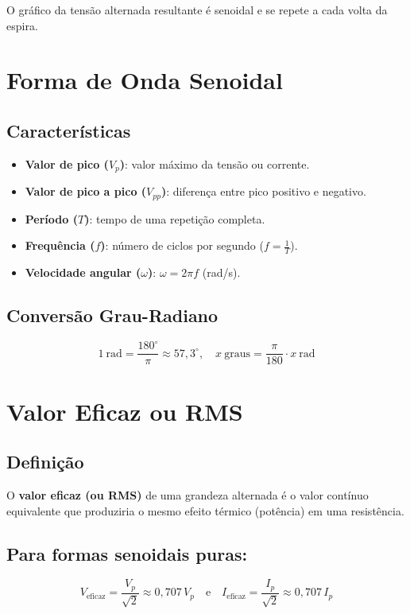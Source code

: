 O gráfico da tensão alternada resultante é senoidal e se repete a cada volta da espira.

\section{Forma de Onda Senoidal}

\subsection{Características}

\begin{itemize}
  \item \textbf{Valor de pico (\(V_p\))}: valor máximo da tensão ou corrente.
  \item \textbf{Valor de pico a pico (\(V_{pp}\))}: diferença entre pico positivo e negativo.
  \item \textbf{Período (\(T\))}: tempo de uma repetição completa.
  \item \textbf{Frequência (\(f\))}: número de ciclos por segundo (\(f = \frac{1}{T}\)).
  \item \textbf{Velocidade angular (\(\omega\))}: \(\omega = 2\pi f\) (rad/s).
\end{itemize}

\subsection{Conversão Grau-Radiano}
\[
1\ \text{rad} = \frac{180^\circ}{\pi} \approx 57,3^\circ, \quad
x\ \text{graus} = \frac{\pi}{180} \cdot x\ \text{rad}
\]

\section{Valor Eficaz ou RMS}

\subsection{Definição}
O \textbf{valor eficaz (ou RMS)} de uma grandeza alternada é o valor contínuo equivalente que produziria o mesmo efeito térmico (potência) em uma resistência.

\subsection{Para formas senoidais puras:}
\[
V_{\text{eficaz}} = \frac{V_p}{\sqrt{2}} \approx 0{,}707\,V_p
\quad\text{e}\quad
I_{\text{eficaz}} = \frac{I_p}{\sqrt{2}} \approx 0{,}707\,I_p
\]

